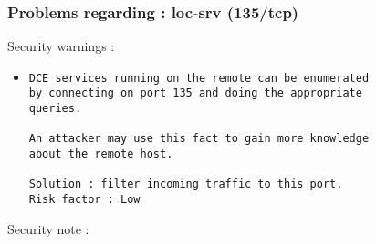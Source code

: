\documentclass{article}
\begin{document}
\subsubsection{Problems regarding : loc-srv (135/tcp)}
Security warnings :\\
\begin{itemize}
\item \begin{verbatim}
DCE services running on the remote can be enumerated
by connecting on port 135 and doing the appropriate
queries.

An attacker may use this fact to gain more knowledge
about the remote host.

Solution : filter incoming traffic to this port.
Risk factor : Low
\end{verbatim}\end{itemize}
Security note :\\
\end{document}
